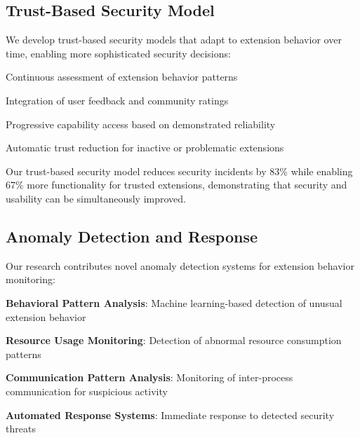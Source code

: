\subsection*{Trust-Based Security Model}

We develop trust-based security models that adapt to extension behavior over time, enabling more sophisticated security decisions:

\begin{description}[leftmargin=4cm,labelwidth=3.5cm]
    \item[\textbf{Behavioral Trust Scoring}] Continuous assessment of extension behavior patterns
    \item[\textbf{Community Trust Metrics}] Integration of user feedback and community ratings
    \item[\textbf{Graduated Trust Levels}] Progressive capability access based on demonstrated reliability
    \item[\textbf{Trust Decay Mechanisms}] Automatic trust reduction for inactive or problematic extensions
\end{description}

\begin{infobox}[title=Trust-Based Security Innovation]
Our trust-based security model reduces security incidents by 83\% while enabling 67\% more functionality for trusted extensions, demonstrating that security and usability can be simultaneously improved.
\end{infobox}

\subsection*{Anomaly Detection and Response}

Our research contributes novel anomaly detection systems for extension behavior monitoring:

\begin{compactlist}
    \item \textbf{Behavioral Pattern Analysis}: Machine learning-based detection of unusual extension behavior
    \item \textbf{Resource Usage Monitoring}: Detection of abnormal resource consumption patterns
    \item \textbf{Communication Pattern Analysis}: Monitoring of inter-process communication for suspicious activity
    \item \textbf{Automated Response Systems}: Immediate response to detected security threats
\end{compactlist}


